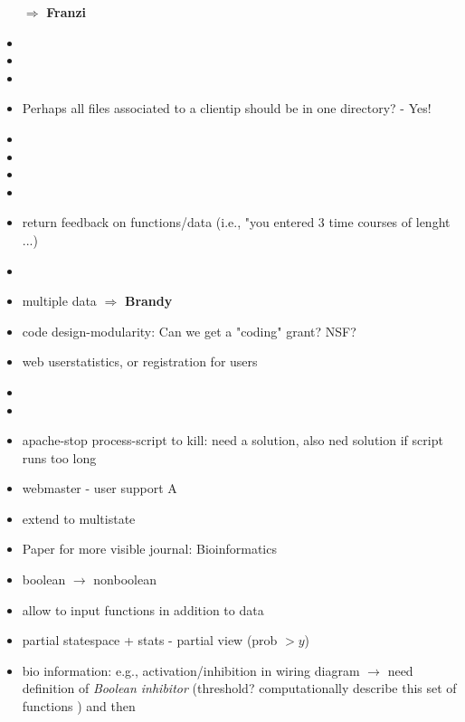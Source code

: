 \documentclass[10pt]{article}
\begin{document}
\begin{itemize}
    $\Rightarrow$ \textbf{Franzi}
    \item {}
    \item {}
    \item {}
    \item Perhaps all files associated to a clientip should be in one
    directory? - Yes!
    \item  {}
    \item  {}
    \item {}
    \item {}
    \item return feedback on functions/data (i.e., "you entered 3 time courses
    of lenght ...)
    \item {}
    \item multiple data $\Rightarrow$ \textbf{Brandy}
    \item code design-modularity: Can we get a "coding" grant? NSF?
    \item web userstatistics, or registration for users
    \item {}
    \item {}
    \item apache-stop process-script to kill: need a solution, also ned
    solution if script runs too long
    \item webmaster - user support A
    \item extend to multistate
    \item Paper for more visible journal: Bioinformatics
    \item boolean $\rightarrow$ nonboolean
    \item allow to input functions in addition to data
    \item partial statespace + stats - partial view (prob $> y$)
    \item bio information: e.g., activation/inhibition in wiring diagram
    $\rightarrow$ need definition of \textit{Boolean inhibitor} (threshold?
    \cite{Edwards:symbolic} computationally describe this set of functions ) and then

\end{itemize}
\end{document}
